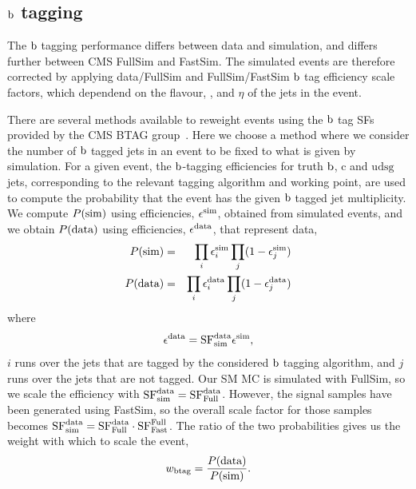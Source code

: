 \subsection{\texorpdfstring{$\mathrm{b}$}{b} tagging \label{sec:boost_btag_sf}} 

The $\mathrm{b}$ tagging performance differs between data and simulation, and differs further between 
CMS FullSim and FastSim.  
The simulated events are therefore corrected by applying data/FullSim and FullSim/FastSim $\mathrm{b}$
tag efficiency scale factors, which dependend on the flavour, \pt, and $\eta$ of the jets in the
event. 

There are several methods available to reweight events using the $\mathrm{b}$ tag SFs provided by the CMS
BTAG group~\cite{BTagSF1}. 
Here we choose a method where we consider the number of $\mathrm{b}$ tagged jets in an event to be fixed
to what is given by simulation.  
For a given event, the $\mathrm{b}$-tagging efficiencies for truth $\mathrm{b}$, $\mathrm{c}$ and
$\mathrm{udsg}$ jets, corresponding to the relevant tagging algorithm and working point, are used to
compute the probability that the event has the given $\mathrm{b}$ tagged jet multiplicity. 
We compute $P({\rm sim})$ using efficiencies, $\epsilon^{\rm sim}$, obtained from simulated events,
and we obtain $P(\rm data)$ using efficiencies, $\epsilon^{\rm data}$, that represent data,
\begin{eqnarray}
P(\rm sim) & = & \prod_{i} \epsilon_i^{\rm sim} \prod_{j} (1 - \epsilon_j^{\rm sim}) \\
P(\rm data) & = & \prod_{i} \epsilon_i^{\rm data} \prod_{j} (1 - \epsilon_j^{\rm data})
\end{eqnarray}
where
\begin{equation}
\epsilon^{\rm data} = {\rm SF}^{\rm data}_{\rm sim} \epsilon^{\rm sim} ,
\end{equation}
$i$ runs over the jets that are tagged by the considered $\mathrm{b}$ tagging algorithm, and $j$
runs over the jets that are not tagged.
Our SM MC is simulated with FullSim, so we scale the efficiency with ${\rm SF}^{\rm data}_{\rm sim}
= {\rm SF}^{\rm data}_{\rm Full}$.  
However, the signal samples have been generated using FastSim, so the overall scale factor for
those samples becomes 
${\rm SF}^{\rm data}_{\rm  sim} = {\rm SF}^{\rm data}_{\rm Full} \cdot {\rm SF}^{\rm Full}_{\rm
Fast}$.
The ratio of the two probabilities gives us the weight with which to scale the event,
\begin{equation}
w_{\rm btag} = \frac{P(\rm data)}{P(\rm sim)} .
\end{equation}

